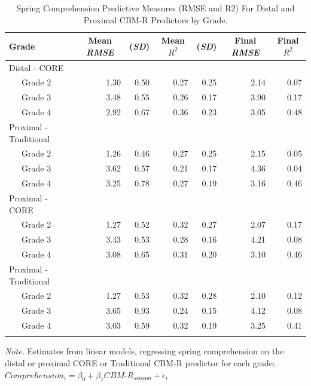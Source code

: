 \documentclass[
  english,
  man, fleqn, noextraspace]{apa6}
\begin{document}
\begin{table}[tbp]

\begin{center}
\begin{threeparttable}

\caption{\label{tab:tbl-pred-comp}Spring Comprehension Predictive Measures (RMSE and R2) For Distal and Proximal CBM-R Predictors by Grade.}

\begin{tabular}{lrrrrrr}
\toprule
Grade & \multicolumn{1}{c}{Mean \emph{RMSE}} & \multicolumn{1}{c}{(\emph{SD})} & \multicolumn{1}{c}{Mean $R^2$} & \multicolumn{1}{c}{(\emph{SD})} & \multicolumn{1}{c}{Final \emph{RMSE}} & \multicolumn{1}{c}{Final $R^2$}\\
\midrule
Distal - CORE &  &  &  &  &  & \\
\ \ \ Grade 2 & 1.30 & 0.50 & 0.27 & 0.25 & 2.14 & 0.07\\
\ \ \ Grade 3 & 3.48 & 0.55 & 0.26 & 0.17 & 3.90 & 0.17\\
\ \ \ Grade 4 & 2.92 & 0.67 & 0.36 & 0.23 & 3.05 & 0.48\\
Proximal - Traditional &  &  &  &  &  & \\
\ \ \ Grade 2 & 1.26 & 0.46 & 0.27 & 0.25 & 2.15 & 0.05\\
\ \ \ Grade 3 & 3.62 & 0.57 & 0.21 & 0.17 & 4.36 & 0.04\\
\ \ \ Grade 4 & 3.25 & 0.78 & 0.27 & 0.19 & 3.16 & 0.46\\
Proximal - CORE &  &  &  &  &  & \\
\ \ \ Grade 2 & 1.27 & 0.52 & 0.32 & 0.27 & 2.07 & 0.17\\
\ \ \ Grade 3 & 3.43 & 0.53 & 0.28 & 0.16 & 4.21 & 0.08\\
\ \ \ Grade 4 & 3.08 & 0.65 & 0.31 & 0.20 & 3.10 & 0.46\\
Proximal - Traditional &  &  &  &  &  & \\
\ \ \ Grade 2 & 1.27 & 0.53 & 0.32 & 0.28 & 2.10 & 0.12\\
\ \ \ Grade 3 & 3.65 & 0.93 & 0.24 & 0.15 & 4.12 & 0.08\\
\ \ \ Grade 4 & 3.03 & 0.59 & 0.32 & 0.19 & 3.25 & 0.41\\
\bottomrule
\addlinespace
\end{tabular}

\begin{tablenotes}[para]
\normalsize{\textit{Note.} Estimates from linear models, regressing spring comprehension on the distal or proximal CORE or Traditional CBM-R predictor for each grade; $Comprehension_i = \beta_0 + \beta_1CBM\mbox{-}R_{season} + \epsilon_i$}
\end{tablenotes}

\end{threeparttable}
\end{center}

\end{table}
\end{document}
